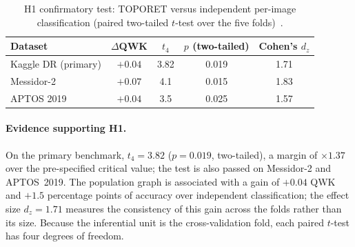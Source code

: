 \begin{table}[!htbp]
\centering
\caption[H1 confirmatory test: graph versus independent classification]{H1 confirmatory test: TOPORET versus independent per-image classification
(paired two-tailed $t$-test over the five folds)~\cite{belhadj2025plos}.}
\label{tab:h1}
\small
\begin{tabular}{@{}lcccc@{}}
\toprule
Dataset & $\Delta$QWK & $t_4$ & $p$ (two-tailed) & Cohen's $d_z$ \\
\midrule
Kaggle DR (primary) & $+0.04$ & 3.82 & 0.019 & 1.71 \\
Messidor-2 & $+0.07$ & 4.1 & 0.015 & 1.83 \\
APTOS 2019 & $+0.04$ & 3.5 & 0.025 & 1.57 \\
\bottomrule
\end{tabular}
\end{table}

\paragraph{Evidence supporting H1.}
On the primary benchmark, $t_4=3.82$ ($p=0.019$, two-tailed), a margin of $\times1.37$ over
the pre-specified critical value; the test is also passed on Messidor-2 and APTOS~2019.
The population graph is associated with a gain of $+0.04$ QWK and $+1.5$ percentage points
of accuracy over independent classification; the effect size $d_z=1.71$ measures the
consistency of this gain across the folds rather than its size. Because the inferential unit is the cross-validation fold,
each paired $t$-test has four degrees of freedom.

